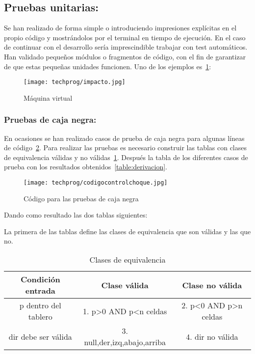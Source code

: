 \subsection{Pruebas unitarias:}
Se han realizado de forma simple o introduciendo impresiones explícitas en el propio código y mostrándolos por el terminal en tiempo de ejecución. En el caso de continuar con el desarrollo sería imprescindible trabajar con test automáticos. Han validado pequeños módulos o fragmentos de código, con el fin de garantizar de que estas pequeñas unidades funcionen. Uno de los ejemplos es~\ref{fig:impacto}:

\begin{figure}[H]
	\centering
	\texttt{[image: techprog/impacto.jpg]}
	\caption{Máquina virtual}\label{fig:impacto}
\end{figure}

\subsubsection{Pruebas de caja negra:}
En ocasiones se han realizado casos de prueba de caja negra para algunas líneas de código~\ref{fig:codigocontrolchoque}. Para realizar las pruebas es necesario construir las tablas con clases de equivalencia válidas y no válidas~\ref{table:casosNegros}. Después la tabla de los diferentes casos de prueba con los resultados obtenidos~\ref{table:derivacion}.

\begin{figure}[H]
	\centering
	\texttt{[image: techprog/codigocontrolchoque.jpg]}
	\caption{Código para las pruebas de caja negra}\label{fig:codigocontrolchoque}
\end{figure}

Dando como resultado las dos tablas siguientes:

La primera de las tablas define las clases de equivalencia que son válidas y las que no.
\begin{table}[H]
	\begin{center}
		\begin{tabular}{ccc}
			\hline
			Condición entrada		& Clase válida		& Clase no válida \\ \hline
			p dentro del tablero	&1. p>0 AND p<n celdas		&2. p<0 AND p>n celdas\\
			dir debe ser válida		&3. null,der,izq,abajo,arriba		&4. dir no válida\\
		\end{tabular}
		\caption{Clases de equivalencia}
		\label{table:casosNegros}
	\end{center}
\end{table}

